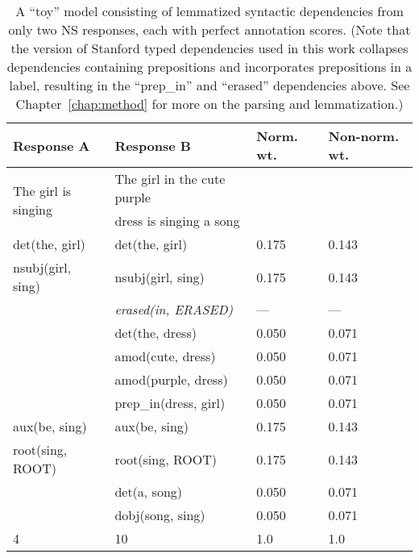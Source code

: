 \begin{table}[htb!]
\begin{center}
\begin{tabular}{|l|l|l|l|}
\hline
Response A & Response B & Norm. wt. & Non-norm. wt.\\
\hline
\multirow{2}{*}{The girl is singing} & The girl in the cute purple & & \\
& dress is singing a song & & \\
\hline
\hline
det(the, girl) & det(the, girl) & 0.175 & 0.143 \\
\hline
nsubj(girl, sing) & nsubj(girl, sing) & 0.175 & 0.143 \\
\hline
& \textit{erased(in, ERASED)} & --- & --- \\
\hline
& det(the, dress) & 0.050 & 0.071 \\
\hline
& amod(cute, dress) & 0.050 & 0.071 \\
\hline
& amod(purple, dress) & 0.050 & 0.071 \\
\hline
& prep\_in(dress, girl) & 0.050 & 0.071 \\
\hline
aux(be, sing) & aux(be, sing) & 0.175 & 0.143 \\
\hline
root(sing, ROOT) & root(sing, ROOT) & 0.175 & 0.143 \\
\hline
& det(a, song) & 0.050 & 0.071 \\
\hline
& dobj(song, sing) & 0.050 & 0.071 \\
\hline
\hline
4 & 10 & 1.0 & 1.0 \\
\hline
\end{tabular}
\caption{\label{tab:normalize-responses-deps} A ``toy'' model consisting of lemmatized syntactic dependencies from only two NS responses, each with perfect annotation scores. (Note that the version of Stanford typed dependencies used in this work collapses dependencies containing prepositions and incorporates prepositions in a label, resulting in the ``prep\_in'' and ``erased'' dependencies above. See Chapter~\ref{chap:method} for more on the parsing and lemmatization.)}
\end{center}
\end{table}

